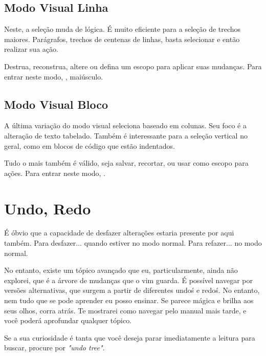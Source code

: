 
\subsection{Modo Visual Linha}
Neste, a seleção muda de lógica.
É muito eficiente para a seleção de trechos maiores.
Parágrafos, trechos de centenas de linhas, basta selecionar e então realizar sua ação.


Destrua, reconstrua, altere ou defina um escopo para aplicar suas mudanças.
Para entrar neste modo, , maiúsculo.

\subsection{Modo Visual Bloco}
A última variação do modo visual seleciona baseado em colunas.
Seu foco é a alteração de texto tabelado.
Também é interessante para a seleção vertical no geral, como em blocos de código que estão indentados.

Tudo o mais também é válido, seja salvar, recortar, ou usar como escopo para ações.
Para entrar neste modo, .


\section{Undo, Redo}
É óbvio que a capacidade de desfazer alterações estaria presente por aqui também.
Para desfazer...  quando estiver no modo normal.
Para refazer...  no modo normal.

No entanto, existe um tópico avançado que eu, particularmente, ainda não explorei, que é a árvore de mudanças que o vim guarda.
É possível navegar por versões alternativas, que surgem a partir de diferentes undo\'s e redo\'s.
No entanto, nem tudo que se pode aprender eu posso ensinar.
Se parece mágica e brilha aos seus olhos, corra atrás.
Te mostrarei como navegar pelo manual mais tarde, e você poderá aprofundar qualquer tópico.

Se a sua curiosidade é tanta que você deseja parar imediatamente a leitura para buscar, procure por \textit{"undo tree"}.


